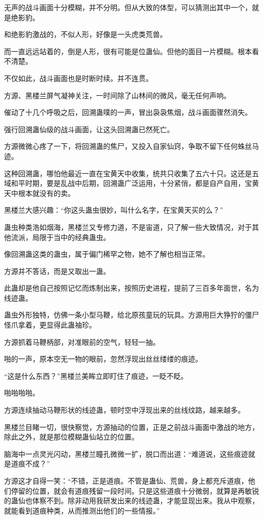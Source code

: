 \begin{this_body}
无声的战斗画面十分模糊，并不分明。但从大致的体型，可以猜测出其中一个，就是绝影豹。

和绝影豹激战的，不似人形，好像是一头虎类荒兽。

而一直远远站着的，倒是人形，很有可能是位蛊仙。但他的面目一片模糊。根本看不清楚。

不仅如此，战斗画面也是时断时续。并不连贯。

方源、黑楼兰屏气凝神关注，一时间除了山林间的微风，毫无任何声响。

催动了十几个呼吸之后，回溯蛊噗的一声，冒出袅袅焦烟，战斗画面骤然消失。

强行回溯蛊仙级的战斗画面，让这头回溯蛊已然死亡。

方源微微心疼了一下，将回溯蛊的焦尸，又投入自家仙窍，争取不留下任何蛛丝马迹。

这种回溯蛊，哪怕他最近一直在宝黄天中收集，统共只收集了五六十只。这还是五域和平时期，要是乱战中后期，回溯蛊广泛运用，十分紧俏，都是自产自用，宝黄天中根本就没有的卖。

黑楼兰大感兴趣：“你这头蛊虫很妙，叫什么名字，在宝黄天买的么？”

蛊虫种类浩如烟海，黑楼兰又专修力道，不是宙道，只了解一些大致情况，对于其他流派，局限于当中的经典蛊虫。

像回溯蛊这类的蛊虫，属于偏门稀罕之物，她不了解也相当正常。

方源并不答话，而是又取出一蛊。

此蛊却是他自己按照记忆而炼制出来，按照历史进程，提前了三百多年面世，名为线迹蛊。

蛊虫外形独特，仿佛一条小型马鞭，给北原孩童玩的玩具。方源用巨大狰狞的僵尸怪爪拿着，更显得此蛊袖珍。

方源抓着马鞭柄部，对准眼前的空气，轻轻一抽。

啪的一声，原本空无一物的眼前，忽然浮现出丝丝缕缕的痕迹。

“这是什么东西？”黑楼兰美眸立即盯住了痕迹，一眨不眨。

啪啪啪啪。

方源连续抽动马鞭形状的线迹蛊，顿时空中浮现出来的丝线纹路，越来越多。

黑楼兰目睹一切，很快察觉，方源抽动的位置，正是之前战斗画面中激战的地方，除此之外，就是那位模糊蛊仙站立的位置。

脑海中一点灵光闪动，黑楼兰瞳孔微微一扩，脱口而出道：“难道说，这些痕迹就是道痕不成？”

方源这才自得一笑：“不错，正是道痕。不管是蛊仙、荒兽，身上都充斥道痕，他们停留的位置，就会有道痕残留一段时间。只是这些道痕十分微弱，就算是再敏锐的蛊仙也体察不到。除非动用我研发出来的线迹蛊，才能显现出来。我从中观察，就能看到道痕种类，从而推测出他们的一些情报。”


\end{this_body}
